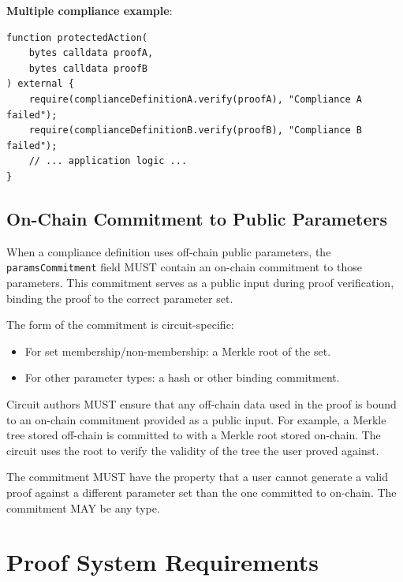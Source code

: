 \documentclass[9pt]{extreport}
\begin{document}
\vspace{2em}
\textbf{Multiple compliance example}:

\begin{singlespace}
\begin{lstlisting}[language=Solidity]
function protectedAction(
    bytes calldata proofA,
    bytes calldata proofB
) external {
    require(complianceDefinitionA.verify(proofA), "Compliance A failed");
    require(complianceDefinitionB.verify(proofB), "Compliance B failed");
    // ... application logic ...
}
\end{lstlisting}
\end{singlespace}

\subsection{On-Chain Commitment to Public Parameters}
\label{sec:on-chain-commitment}

When a compliance definition uses off-chain public parameters, the \texttt{paramsCommitment} field MUST contain an on-chain commitment to those parameters. This commitment serves as a public input during proof verification, binding the proof to the correct parameter set.

The form of the commitment is circuit-specific:
\begin{itemize}
    \item For set membership/non-membership: a Merkle root of the set.
    \item For other parameter types: a hash or other binding commitment.
\end{itemize}

Circuit authors MUST ensure that any off-chain data used in the proof is bound to an on-chain commitment provided as a public input.  For example, a Merkle tree stored off-chain is committed to with a Merkle root stored on-chain.  The circuit uses the root to verify the validity of the tree the user proved against.  

The commitment MUST have the property that a user cannot generate a valid proof against a different parameter set than the one committed to on-chain.  The commitment MAY be any type.

\section{Proof System Requirements}
\label{sec:proof-system}
\end{document}
